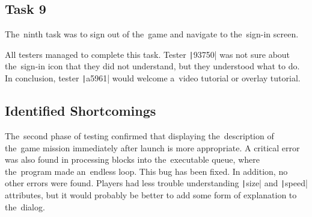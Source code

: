 \subsection*{Task 9}

The~ninth task was to sign out of the~game and navigate to the~sign-in screen.

All testers managed to complete this task.
Tester \texttt|93750| was not sure about the~sign-in icon that they did not understand, but they understood what to do.
In conclusion, tester \texttt|a5961| would welcome a~video tutorial or overlay tutorial.

\pagebreak

\subsection*{Identified Shortcomings}

The~second phase of testing confirmed that displaying the~description of the~game mission immediately after launch is more appropriate.
A critical error was also found in processing blocks into the~executable queue, where the~program made an~endless loop.
This bug has been fixed.
In addition, no other errors were found.
Players had less trouble understanding \texttt|size| and \texttt|speed| attributes, but it would probably be better to add some form of explanation to the~dialog.
